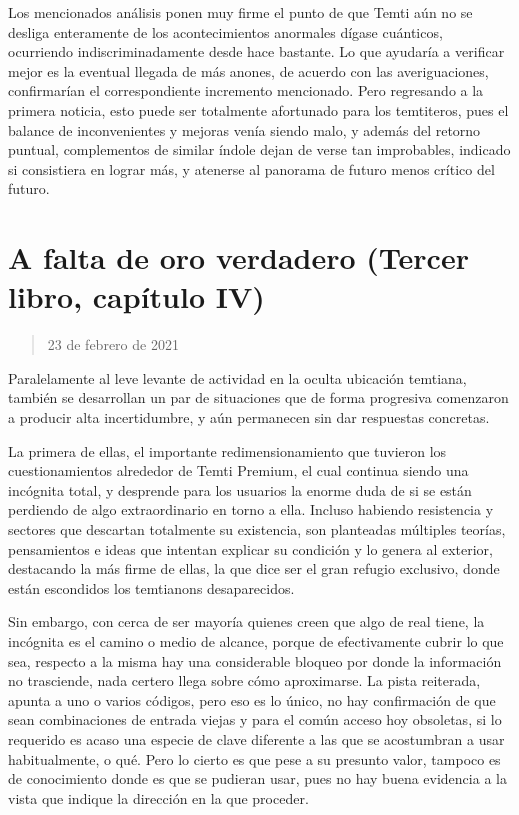 \documentclass[
]{book}
\begin{document}
Los mencionados análisis ponen muy firme el punto de que Temti aún no se desliga enteramente de los acontecimientos anormales dígase cuánticos, ocurriendo indiscriminadamente desde hace bastante. Lo que ayudaría a verificar mejor es la eventual llegada de más anones, de acuerdo con las averiguaciones, confirmarían el correspondiente incremento mencionado. Pero regresando a la primera noticia, esto puede ser totalmente afortunado para los temtiteros, pues el balance de inconvenientes y mejoras venía siendo malo, y además del retorno puntual, complementos de similar índole dejan de verse tan improbables, indicado si consistiera en lograr más, y atenerse al panorama de futuro menos crítico del futuro.

\hypertarget{a-falta-de-oro-verdadero-tercer-libro-capuxedtulo-iv}{%
\section{A falta de oro verdadero (Tercer libro, capítulo IV)}\label{a-falta-de-oro-verdadero-tercer-libro-capuxedtulo-iv}}

\begin{quote}
23 de febrero de 2021
\end{quote}

Paralelamente al leve levante de actividad en la oculta ubicación temtiana, también se desarrollan un par de situaciones que de forma progresiva comenzaron a producir alta incertidumbre, y aún permanecen sin dar respuestas concretas.

La primera de ellas, el importante redimensionamiento que tuvieron los cuestionamientos alrededor de Temti Premium, el cual continua siendo una incógnita total, y desprende para los usuarios la enorme duda de si se están perdiendo de algo extraordinario en torno a ella. Incluso habiendo resistencia y sectores que descartan totalmente su existencia, son planteadas múltiples teorías, pensamientos e ideas que intentan explicar su condición y lo genera al exterior, destacando la más firme de ellas, la que dice ser el gran refugio exclusivo, donde están escondidos los temtianons desaparecidos.

Sin embargo, con cerca de ser mayoría quienes creen que algo de real tiene, la incógnita es el camino o medio de alcance, porque de efectivamente cubrir lo que sea, respecto a la misma hay una considerable bloqueo por donde la información no trasciende, nada certero llega sobre cómo aproximarse. La pista reiterada, apunta a uno o varios códigos, pero eso es lo único, no hay confirmación de que sean combinaciones de entrada viejas y para el común acceso hoy obsoletas, si lo requerido es acaso una especie de clave diferente a las que se acostumbran a usar habitualmente, o qué. Pero lo cierto es que pese a su presunto valor, tampoco es de conocimiento donde es que se pudieran usar, pues no hay buena evidencia a la vista que indique la dirección en la que proceder.
\end{document}
